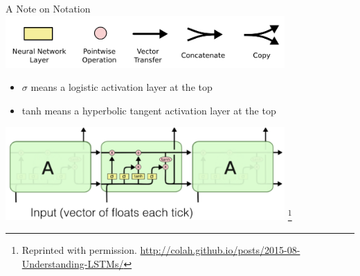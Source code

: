 \documentclass[aspectratio=169]{beamer}
\begin{document}
\begin{frame}{A Note on Notation}
\includegraphics[width=0.8\textwidth]{lectLSTM/LSTM2-notation.png}\\
\begin{itemize}
	\item $\sigma$ means a logistic activation layer at the top
	\item tanh means a hyperbolic tangent activation layer at the top
	\end{itemize}
\includegraphics[width=0.8\textwidth]{lectLSTM/LSTMNew.png}
\footnote{Reprinted with permission. \url{http://colah.github.io/posts/2015-08-Understanding-LSTMs/}}
\end{frame}
\end{document}
